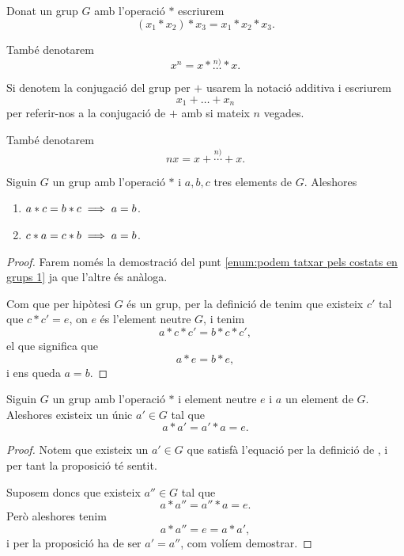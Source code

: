 \documentclass[../Apunts.tex]{subfiles}
\begin{document}
	\begin{notation}
		\label{notation:potencies per l'operació repetida en un grup}
		Donat un grup \(G\) amb l'operació \(\ast\) escriurem
		\[(x_{1}\ast x_{2})\ast x_{3}=x_{1}\ast x_{2}\ast x_{3}.\]
		
		També denotarem
		\[x^{n}=x\ast\overset{n)}{\dots}\ast x.\]
		
		Si denotem la conjugació del grup per \(+\) usarem la notació additiva i escriurem
		\[x_{1}+\dots+x_{n}\]
		per referir-nos a la conjugació de \(+\) amb si mateix \(n\) vegades.
		
		També denotarem
		\[nx=x+\overset{n)}{\cdots}+ x.\]
	\end{notation}
	\begin{proposition}
		\label{prop:podem tatxar pels costats en grups}
		Siguin \(G\) un grup amb l'operació \(\ast\) i \(a,b,c\) tres elements de \(G\). Aleshores
		\begin{enumerate}
			\item\label{enum:podem tatxar pels costats en grups 1} \(a\ast c=b\ast c\implies a=b\).
			\item\label{enum:podem tatxar pels costats en grups 2} \(c\ast a=c\ast b\implies a=b\).
		\end{enumerate}
		\begin{proof}
			Farem només la demostració del punt \eqref{enum:podem tatxar pels costats en grups 1} ja que l'altre és anàloga.
			
			Com que per hipòtesi \(G\) és un grup, per la definició de  tenim que existeix \(c'\) tal que \(c\ast c'=e\), on \(e\) és l'element neutre \(G\), i tenim
			\[a\ast c\ast c'=b\ast c\ast c',\]
			el que significa que
			\[a\ast e=b\ast e,\]
			i ens queda \(a=b\).
		\end{proof}
	\end{proposition}
	\begin{proposition}
		\label{prop:unicitat inversa en grups}
		Siguin \(G\) un grup amb l'operació \(\ast\) i element neutre \(e\) i \(a\) un element de \(G\). Aleshores existeix un únic \(a'\in G\) tal que
		\[a\ast a'=a'\ast a=e.\]
		\begin{proof}
			Notem que existeix un \(a'\in G\) que satisfà l'equació per la definició de , i per tant la proposició té sentit.
			
			Suposem doncs que existeix \(a''\in G\) tal que
			\[a\ast a''=a''\ast a=e.\]
			Però aleshores tenim
			\[a\ast a''=e=a\ast a',\]
			i per la proposició  ha de ser \(a'=a''\), com volíem demostrar.
		\end{proof} 
	\end{proposition}
\end{document}
